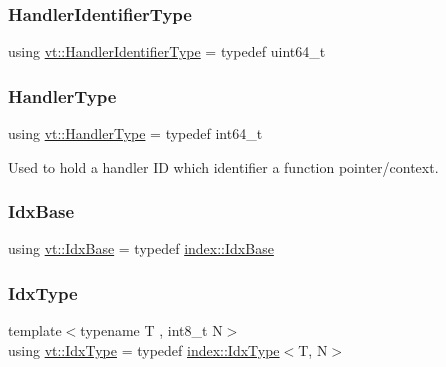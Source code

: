 \mbox{\label{namespacevt_a59ae068fe828d1c33051ff96f3d016b6}} 
\subsubsection{\texorpdfstring{Handler\+Identifier\+Type}{HandlerIdentifierType}}
{\footnotesize\ttfamily using \hyperlink{namespacevt_a59ae068fe828d1c33051ff96f3d016b6}{vt\+::\+Handler\+Identifier\+Type} = typedef uint64\+\_\+t}

\mbox{\label{namespacevt_af64846b57dfcaf104da3ef6967917573}} 
\subsubsection{\texorpdfstring{Handler\+Type}{HandlerType}}
{\footnotesize\ttfamily using \hyperlink{namespacevt_af64846b57dfcaf104da3ef6967917573}{vt\+::\+Handler\+Type} = typedef int64\+\_\+t}



Used to hold a handler ID which identifier a function pointer/context. 

\mbox{\label{namespacevt_afb96657e28fa98eb685c5e0c6b1b122e}} 
\subsubsection{\texorpdfstring{Idx\+Base}{IdxBase}}
{\footnotesize\ttfamily using \hyperlink{namespacevt_afb96657e28fa98eb685c5e0c6b1b122e}{vt\+::\+Idx\+Base} = typedef \hyperlink{namespacevt_1_1index_a0dbb8d47463da27c1436e8e4ddb02743}{index\+::\+Idx\+Base}}

\mbox{\label{namespacevt_a906c25b521ff516f5e8ba6d96fe2d424}} 
\subsubsection{\texorpdfstring{Idx\+Type}{IdxType}}
{\footnotesize\ttfamily template$<$typename T , int8\+\_\+t N$>$ \\
using \hyperlink{namespacevt_a906c25b521ff516f5e8ba6d96fe2d424}{vt\+::\+Idx\+Type} = typedef \hyperlink{namespacevt_1_1index_a939bace7aba6cd4a76b2c12a138c5991}{index\+::\+Idx\+Type}$<$T, N$>$}

